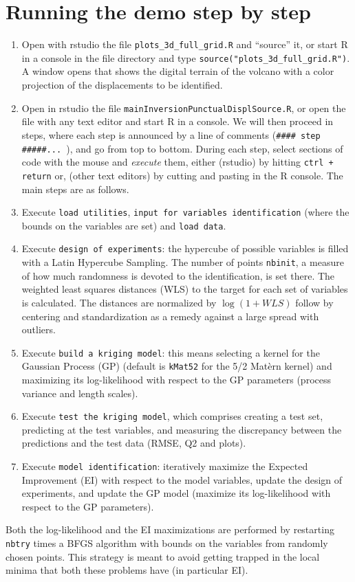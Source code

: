 \documentclass[12pt]{article}
\begin{document}
\section{Running the demo step by step}
\begin{enumerate}
\item Open with rstudio the file \texttt{plots\_3d\_full\_grid.R} and ``source'' it, or start R in a console in the file directory and type
\texttt{source("plots\_3d\_full\_grid.R")}. A window opens that shows the digital terrain of the volcano with a color projection of the displacements 
to be identified.
\item Open in rstudio the file \texttt{mainInversionPunctualDisplSource.R}, or open the file with any text editor and start R in a console. 
We will then proceed in steps, where each step is announced by a line of comments (\verb=#### step #####... =), and go from top to bottom. 
During each step, select sections of code with the mouse and \emph{execute} them, either (rstudio) by hitting \texttt{ctrl + return} 
or, (other text editors) by cutting and pasting in the R console. The main steps are as follows.
\item Execute \texttt{load utilities}, \texttt{input for variables identification} (where the bounds on the variables are set) and \texttt{load data}.  
\item Execute \texttt{design of experiments}: the hypercube of possible variables is filled with a Latin Hypercube Sampling. The number of points 
\texttt{nbinit}, a measure of how much randomness is devoted to the identification, is set there. 
The weighted least squares distances (WLS) to the target for each set of variables is calculated. The distances are normalized by 
$\log(1+WLS)$ follow by centering and standardization as a remedy against a large spread with outliers.
\item Execute \texttt{build a kriging model}: this means selecting a kernel for the Gaussian Process (GP) (default is \texttt{kMat52} for 
the 5/2 Mat\`ern kernel) and maximizing its log-likelihood with respect to the GP parameters (process variance and length scales).
\item Execute \texttt{test the kriging model}, which comprises creating a test set, predicting at the test variables, and measuring 
the discrepancy between the predictions and the test data (RMSE, Q2 and plots).
\item Execute \texttt{model identification}: iteratively maximize the Expected Improvement (EI) with respect to the model variables, 
update the design of experiments, and update the GP model (maximize its log-likelihood with respect to the GP parameters).
\end{enumerate}
Both the log-likelihood and the EI maximizations are performed by restarting \texttt{nbtry} times 
a BFGS algorithm with bounds on the variables from randomly chosen points. This strategy is meant to avoid getting trapped in the local 
minima that both these problems have (in particular EI).
\end{document}
